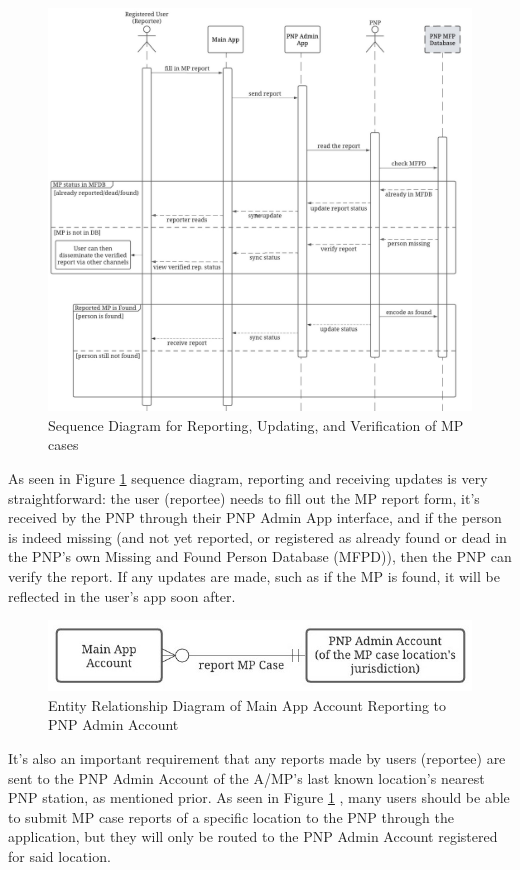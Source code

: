 \begin{figure}[!h]
    \centering
    \includegraphics{figures/Chapter3/Chapt3_seqDiag_report.jpeg}
    \caption{Sequence Diagram for Reporting, Updating, and Verification of MP cases}
    \label{fig:seqDiaReport}
\end{figure}
As seen in Figure \ref{fig:seqDiaReport} sequence diagram, reporting and receiving updates is very straightforward: the user (reportee) needs to fill out the MP report form, it’s received by the PNP through their PNP Admin App interface, and if the person is indeed missing (and not yet reported, or registered as already found or dead in the PNP's own Missing and Found Person Database (MFPD)), then the PNP can verify the report. If any updates are made, such as if the MP is found, it will be reflected in the user’s app soon after.

\begin{figure}[!h]
    \centering
    \includegraphics[width=\textwidth]{figures/Chapter3/Chapt3_ERDiag_reporteePNP.jpeg}
    \caption{Entity Relationship Diagram of Main App Account Reporting to PNP Admin Account}
    \label{fig:ERDReportee}
\end{figure}
It’s also an important requirement that any reports made by users (reportee) are sent to the PNP Admin Account of the A/MP's last known location’s nearest PNP station, as mentioned prior. As seen in Figure \ref{fig:seqDiaReport} , many users should be able to submit MP case reports of a specific location to the PNP through the application, but they will only be routed to the PNP Admin Account registered for said location.

